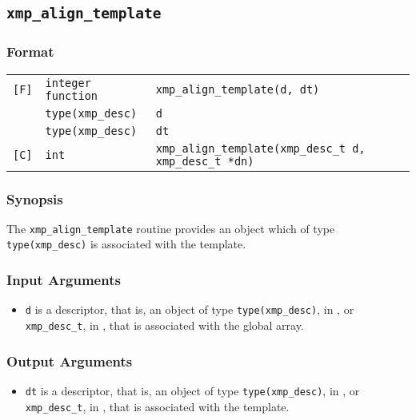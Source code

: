 \subsection{\tt xmp\_align\_template}

\subsubsection*{Format}

\begin{tabular}{lll}

\verb![F]!& {\tt integer function}& {\tt xmp\_align\_template(d, dt)}\\
          & {\tt type(xmp\_desc)} & {\tt d}\\
          & {\tt type(xmp\_desc)} & {\tt dt}\\

\verb![C]!&  {\tt int}& {\tt xmp\_align\_template(xmp\_desc\_t d, xmp\_desc\_t *dn)}\\

\end{tabular}

\subsubsection*{Synopsis}

The {\tt xmp\_align\_template} routine provides an object which of type {\tt type(xmp\_desc)} is associated with the template.


\subsubsection*{Input Arguments}
\begin{itemize}
 \item {\tt d} is a descriptor, that is, an object of type 
       {\tt type(xmp\_desc)}, in {\XMPF}, or {\tt xmp\_desc\_t},
       in {\XMPC}, that is associated with the global array.
\end{itemize}

\subsubsection*{Output Arguments}
\begin{itemize}
 \item {\tt dt} is a descriptor, that is, an object of type 
       {\tt type(xmp\_desc)}, in {\XMPF}, or {\tt xmp\_desc\_t},
       in {\XMPC}, that is associated with the template.
\end{itemize}


